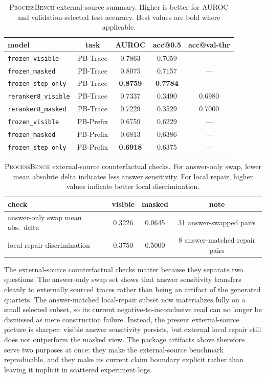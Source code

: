 \begin{table}[h]
\centering
\caption{\textsc{ProcessBench} external-source summary. Higher is better for
AUROC and validation-selected test accuracy. Best values are bold where
applicable.}
\label{tab:appendix_processbench}
\small
\begin{tabular}{lcccc}
\toprule
model & task & AUROC & acc@0.5 & acc@val-thr \\
\midrule
\texttt{frozen\_visible} & PB-Trace & 0.7863 & 0.7059 & --- \\
\texttt{frozen\_masked} & PB-Trace & 0.8075 & 0.7157 & --- \\
\texttt{frozen\_step\_only} & PB-Trace & \textbf{0.8759} & \textbf{0.7784} & --- \\
\texttt{reranker8\_visible} & PB-Trace & 0.7337 & 0.3490 & 0.6980 \\
\texttt{reranker8\_masked} & PB-Trace & 0.7229 & 0.3529 & 0.7000 \\
\texttt{frozen\_visible} & PB-Prefix & 0.6759 & 0.6229 & --- \\
\texttt{frozen\_masked} & PB-Prefix & 0.6813 & 0.6386 & --- \\
\texttt{frozen\_step\_only} & PB-Prefix & \textbf{0.6918} & 0.6375 & --- \\
\bottomrule
\end{tabular}
\end{table}

\begin{table}[h]
\centering
\caption{\textsc{ProcessBench} external-source counterfactual checks. For
answer-only swap, lower mean absolute delta indicates less answer sensitivity.
For local repair, higher values indicate better local discrimination.}
\label{tab:appendix_processbench_cf}
\small
\begin{tabular}{lccc}
\toprule
check & visible & masked & note \\
\midrule
answer-only swap mean abs.\ delta & 0.3226 & 0.0645 & 31 answer-swapped pairs \\
local repair discrimination & 0.3750 & 0.5000 & 8 answer-matched repair pairs \\
\bottomrule
\end{tabular}
\end{table}

The external-source counterfactual checks matter because they separate two
questions. The answer-only swap set shows that answer sensitivity transfers
cleanly to externally sourced traces rather than being an artifact of the
generated quartets. The answer-matched local-repair subset now materializes
fully on a small selected subset, so its current negative-to-inconclusive read
can no longer be dismissed as mere construction failure. Instead, the present
external-source picture is sharper: visible answer sensitivity persists, but
external local repair still does not outperform the masked view. The package
artifacts above therefore serve two purposes at once: they make the
external-source benchmark reproducible, and they make its current claim
boundary explicit rather than leaving it implicit in scattered experiment
logs.

